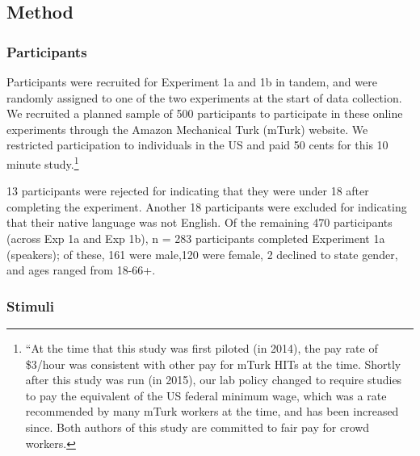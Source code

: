 \documentclass[man, floatsintext, noapacite]{apa6}
\begin{document}
\subsection{Method}

\subsubsection{Participants} 

Participants were recruited for Experiment 1a and 1b in tandem, and were randomly assigned to one of the two experiments at the start of data collection. We recruited a planned sample of 500 participants to participate in these online experiments through the Amazon Mechanical Turk (mTurk) website. We restricted participation to individuals in the US and paid 50 cents for this 10 minute study.\footnote{“At the time that this study was first piloted (in 2014), the pay rate of \$3/hour was consistent with other pay for mTurk HITs at the time. Shortly after this study was run (in 2015), our lab policy changed to require studies to pay the equivalent of the US federal minimum wage, which was a rate recommended by many mTurk workers at the time, and has been increased since. Both authors of this study are committed to fair pay for crowd workers.}

 13 participants were rejected for indicating that they were under 18 after completing the experiment. Another 18 participants were excluded for indicating that their native language was not English. Of the remaining 470 participants (across Exp 1a and Exp 1b), n = 283 participants completed Experiment 1a (speakers); of these, 161 were male,120 were female, 2 declined to state gender, and ages ranged from 18-66+.

\subsubsection{Stimuli}
\end{document}
